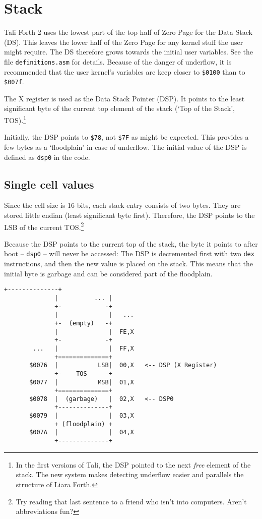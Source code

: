 
\section{Stack}

Tali Forth 2 uses the lowest part of the top half of Zero Page
for the Data Stack (DS). This leaves the lower half of the Zero Page for any
kernel stuff the user might require. The DS therefore grows towards the initial
user variables. See the file \texttt{definitions.asm} for details.  Because of
the danger of underflow, it is recommended that the user
kernel's variables are keep closer to \texttt{\$0100} than to \texttt{\$007f}.

The X register is used as the Data Stack Pointer (DSP). It
points to the least significant byte of the current top element of the stack
(`Top of the Stack', TOS).\footnote{In the first versions of Tali, the DSP pointed to the next \textit{free} element of the stack. The
new system makes detecting underflow easier and parallels the structure of Liara
Forth.}

Initially, the DSP points to \texttt{\$78}, not \texttt{\$7F} as might be
expected. This provides a few bytes as a `floodplain'
in case of underflow. The initial value of the DSP is defined
as \texttt{dsp0} in the code.

\subsection{Single cell values} Since the cell size is 16 bits, each stack entry
consists of two bytes. They are stored little endian (least
significant byte first). Therefore, the DSP points to the LSB of the current
TOS.\footnote{Try reading that last sentence to a friend who isn't into
computers. Aren't abbreviations fun?}

Because the DSP points to the current top of the stack, the byte it points to
after boot -- \texttt{dsp0} -- will never be accessed: The DSP is decremented first with
two \texttt{dex} instructions, and then the new value is placed on the stack. This
means that the initial byte is garbage and can be considered part of the floodplain. 

\begin{lstlisting}[frame=single]
              +--------------+           
              |          ... |  
              +-            -+ 
              |              |   ...
              +-  (empty)   -+
              |              |  FE,X
              +-            -+ 
        ...   |              |  FF,X
              +==============+  
       $0076  |           LSB|  00,X   <-- DSP (X Register)
              +-    TOS     -+ 
       $0077  |           MSB|  01,X
              +==============+ 
       $0078  |  (garbage)   |  02,X   <-- DSP0 
              +--------------+           
       $0079  |              |  03,X
              + (floodplain) + 
       $007A  |              |  04,X
              +--------------+           
\end{lstlisting}

